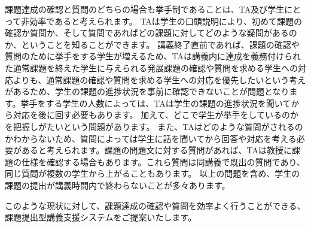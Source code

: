 \documentclass[a4j,titlepage]{ujarticle}
\begin{document}
課題達成の確認と質問のどちらの場合も挙手制であることは、TA及び学生にとって非効率であると考えられます。
TAは学生の口頭説明により、初めて課題の確認か質問か、そして質問であればどの課題に対してどのような疑問があるのか、ということを知ることができます。
講義終了直前であれば、課題の確認や質問のために挙手をする学生が増えるため、TAは講義内に達成を義務付けられた通常課題を終えた学生に与えられる発展課題の確認や質問を求める学生への対応よりも、通常課題の確認や質問を求める学生への対応を優先したいという考えがあるため、学生の課題の進捗状況を事前に確認できないことが問題となります。挙手をする学生の人数によっては、TAは学生の課題の進捗状況を聞いてから対応を後に回す必要もあります。
加えて、どこで学生が挙手をしているのかを把握しがたいという問題があります。
また、TAはどのような質問がされるのかわからないため、質問によっては学生に話を聞いてから回答や対応を考える必要があると考えられます。課題の問題文に対する質問があれば、TAは教授に課題の仕様を確認する場合もあります。これら質問は同講義で既出の質問であり、同じ質問が複数の学生から上がることもあります。
以上の問題を含め、学生の課題の提出が講義時間内で終わらないことが多々あります。

このような現状に対して、課題達成の確認や質問を効率よく行うことができる、課題提出型講義支援システムをご提案いたします。
\end{document}
